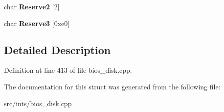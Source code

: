 \begin{DoxyCompactItemize}
\item 
\hypertarget{structNHD__FILE__HEAD_a52453e263173df250e050ed0d5934601}{char {\bfseries Reserve2} \mbox{[}2\mbox{]}}\label{structNHD__FILE__HEAD_a52453e263173df250e050ed0d5934601}

\item 
\hypertarget{structNHD__FILE__HEAD_a18b155dc7152421bb887c3ccc51b9a41}{char {\bfseries Reserve3} \mbox{[}0xe0\mbox{]}}\label{structNHD__FILE__HEAD_a18b155dc7152421bb887c3ccc51b9a41}

\end{DoxyCompactItemize}


\subsection{Detailed Description}


Definition at line 413 of file bios\-\_\-disk.\-cpp.



The documentation for this struct was generated from the following file\-:\begin{DoxyCompactItemize}
\item 
src/ints/bios\-\_\-disk.\-cpp\end{DoxyCompactItemize}
